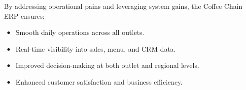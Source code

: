By addressing operational pains and leveraging system gains, the Coffee Chain ERP ensures:
\begin{itemize}
    \item Smooth daily operations across all outlets.
    \item Real-time visibility into sales, menu, and CRM data.
    \item Improved decision-making at both outlet and regional levels.
    \item Enhanced customer satisfaction and business efficiency.
\end{itemize}
